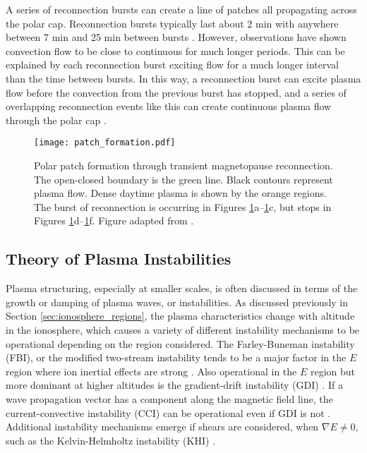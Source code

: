 A series of reconnection bursts can create a line of patches all propagating across the polar cap.  Reconnection bursts typically last about 2 min with anywhere between 7 min and 25 min between bursts \citep{Foster1984,Etemadi1988,Lockwood1992b}.  However, observations have shown convection flow to be close to continuous for much longer periods.  This can be explained by each reconnection burst exciting flow for a much longer interval than the time between bursts.  In this way, a reconnection burst can excite plasma flow before the convection from the previous burst has stopped, and a series of overlapping reconnection events like this can create continuous plasma flow through the polar cap \citep{Cowley1991}. 

\begin{figure}
	\centering
	\texttt{[image: patch\_formation.pdf]}
	\caption[Polar patch formation]{Polar patch formation through transient magnetopause reconnection.  The open-closed boundary is the green line.  Black contours represent plasma flow.  Dense daytime plasma is shown by the orange regions.  The burst of reconnection is occurring in Figures \ref{fig:patch_formation}a--\ref{fig:patch_formation}c, but stops in Figures \ref{fig:patch_formation}d--\ref{fig:patch_formation}f.  Figure adapted from \citet{Cowley1991}.}
	\label{fig:patch_formation}
\end{figure}

\subsection{Theory of Plasma Instabilities}
\label{sec:lit_instabilities}
Plasma structuring, especially at smaller scales, is often discussed in terms of the growth or damping of plasma waves, or instabilities.  As discussed previously in Section \ref{sec:ionosphere_regions}, the plasma characteristics change with altitude in the ionosphere, which causes a variety of different instability mechanisms to be operational depending on the region considered.  The Farley-Buneman instability (FBI), or the modified two-stream instability tends to be a major factor in the \(E\) region where ion inertial effects are strong \citep{Farley1963,Buneman1963}.  Also operational in the \(E\) region but more dominant at higher altitudes is the gradient-drift instability (GDI) \citep{Simon1963,Hoh1963,Linson1970}.  If a wave propagation vector has a component along the magnetic field line, the current-convective instability (CCI) can be operational even if GDI is not \citep{Hoh1960,Ossakow1979,Chaturvedi1981}.  Additional instability mechanisms emerge if shears are considered, when \(\nabla E \neq 0\), such as the Kelvin-Helmholtz instability (KHI) \citep{Kintner1977,DAngelo1965}.

